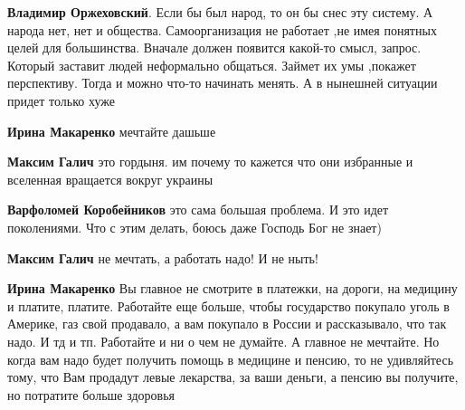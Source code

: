 \begin{itemize}
\begin{itemize}
\textbf{Владимир Оржеховский}. Если бы был народ, то он бы снес эту систему. А народа нет, нет и общества. Самоорганизация не работает ,не имея понятных целей для большинства. Вначале должен появится какой-то смысл, запрос. Который заставит людей неформально общаться. Займет их умы ,покажет перспективу. Тогда и можно что-то начинать менять. А в нынешней ситуации придет только хуже

 
\textbf{Ирина Макаренко} мечтайте дашьше

 
\textbf{Максим Галич} это гордыня. им почему то кажется что они избранные и вселенная вращается вокруг украины

 
\textbf{Варфоломей Коробейников} это сама большая проблема. И это идет поколениями. Что с этим делать, боюсь даже Господь Бог не знает)

 
\textbf{Максим Галич} не мечтать, а работать надо! И не ныть!

 
\textbf{Ирина Макаренко} Вы главное не смотрите в платежки, на дороги, на
медицину и платите, платите. Работайте еще больше, чтобы государство покупало
уголь в Америке, газ свой продавало, а вам покупало в России и рассказывало,
что так надо. И тд и тп. Работайте и ни о чем не думайте. А главное не
мечтайте. Но когда вам надо будет получить помощь в медицине и пенсию, то не
удивляйтесь тому, что Вам продадут левые лекарства, за ваши деньги, а пенсию вы
получите, но потратите больше здоровья


\end{itemize}
\end{itemize}
